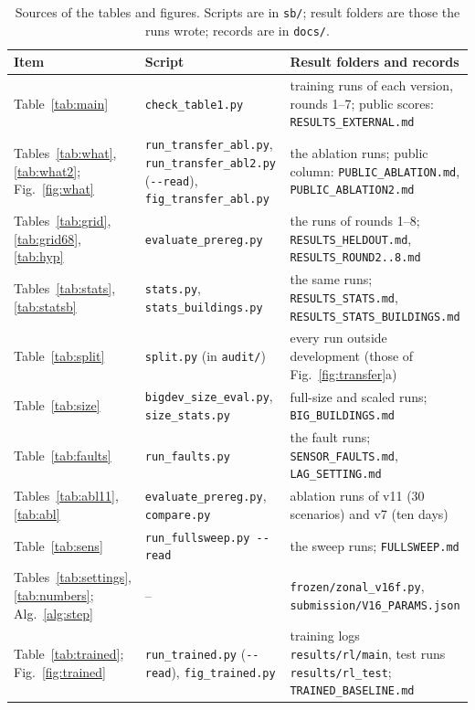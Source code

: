 \documentclass{article}
\begin{document}
\begin{table}[!htb]\centering
\caption{Sources of the tables and figures. Scripts are in \texttt{sb/}; result folders are those the runs wrote;
records are in \texttt{docs/}.}\label{tab:repro}
\small
\begin{tabular}{>{\raggedright\arraybackslash}p{2.2cm}>{\raggedright\arraybackslash}p{4.2cm}>{\raggedright\arraybackslash}p{6.2cm}}\toprule
Item & Script & Result folders and records\\\midrule
Table~\ref{tab:main} & \texttt{check\_table1.py} & training runs of each version, rounds 1--7; public scores: \texttt{RESULTS\_EXTERNAL.md}\\
Tables~\ref{tab:what}, \ref{tab:what2}; Fig.~\ref{fig:what} & \texttt{run\_transfer\_abl.py}, \texttt{run\_transfer\_abl2.py} (\texttt{-{}-read}), \texttt{fig\_transfer\_abl.py} & the ablation runs; public column: \texttt{PUBLIC\_ABLATION.md}, \texttt{PUBLIC\_ABLATION2.md}\\
Tables~\ref{tab:grid}, \ref{tab:grid68}, \ref{tab:hyp} & \texttt{evaluate\_prereg.py} & the runs of rounds 1--8; \texttt{RESULTS\_HELDOUT.md}, \texttt{RESULTS\_ROUND2..8.md}\\
Tables~\ref{tab:stats}, \ref{tab:statsb} & \texttt{stats.py}, \texttt{stats\_buildings.py} & the same runs; \texttt{RESULTS\_STATS.md}, \texttt{RESULTS\_STATS\_BUILDINGS.md}\\
Table~\ref{tab:split} & \texttt{split.py} (in \texttt{audit/}) & every run outside development (those of Fig.~\ref{fig:transfer}a)\\
Table~\ref{tab:size} & \texttt{bigdev\_size\_eval.py}, \texttt{size\_stats.py} & full-size and scaled runs; \texttt{BIG\_BUILDINGS.md}\\
Table~\ref{tab:faults} & \texttt{run\_faults.py} & the fault runs; \texttt{SENSOR\_FAULTS.md}, \texttt{LAG\_SETTING.md}\\
Tables~\ref{tab:abl11}, \ref{tab:abl} & \texttt{evaluate\_prereg.py}, \texttt{compare.py} & ablation runs of v11 (30 scenarios) and v7 (ten days)\\
Table~\ref{tab:sens} & \texttt{run\_fullsweep.py -{}-read} & the sweep runs; \texttt{FULLSWEEP.md}\\
Tables~\ref{tab:settings}, \ref{tab:numbers}; Alg.~\ref{alg:step} & -- & \texttt{frozen/zonal\_v16f.py}, \texttt{submission/V16\_PARAMS.json}\\
Table~\ref{tab:trained}; Fig.~\ref{fig:trained} & \texttt{run\_trained.py} (\texttt{-{}-read}), \texttt{fig\_trained.py} & training logs \texttt{results/rl/main}, test runs \texttt{results/rl\_test}; \texttt{TRAINED\_BASELINE.md}\\

\end{tabular}
\end{table}
\end{document}
